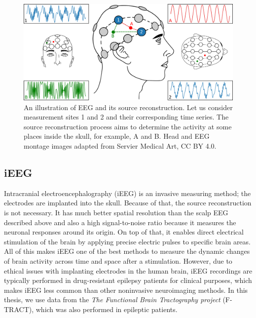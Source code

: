 \begin{figure}
  \begin{center}
    \includegraphics[width=\textwidth]{images/manually_created/brain/EEG_source_reconstruction.png.pdf}
  \end{center}
  \caption[An artistic illustration of EEG and its source reconstruction]{An illustration of EEG and its source reconstruction. Let us consider measurement sites 1 and 2 and their corresponding time series. The source reconstruction process aims to determine the activity at some places inside the skull, for example, A and B. Head and EEG montage images adapted from Servier Medical Art, CC BY 4.0.}
  \label{fig:EEG}
\end{figure}

\subsection{iEEG}\label{sec:iEEG}

Intracranial electroencephalography (iEEG) is an invasive measuring method; the electrodes are implanted into the skull. Because of that, the source reconstruction is not necessary. It has much better spatial resolution than the scalp EEG described above and also a high signal-to-noise ratio because it measures the neuronal responses around its origin. On top of that, it enables direct electrical stimulation of the brain by applying precise electric pulses to specific brain areas.
All of this makes iEEG one of the best methods to measure the dynamic changes of brain activity across time and space after a stimulation. However, due to ethical issues with implanting electrodes in the human brain, iEEG recordings are typically performed in drug-resistant epilepsy patients for clinical purposes, which makes iEEG less common than other noninvasive neuroimaging methods. In this thesis, we use data from the \textit{The Functional Brain Tractography project} (F-TRACT), which was also performed in epileptic patients. \cite{axmacher_what_2023,seguin_communication_2023}

